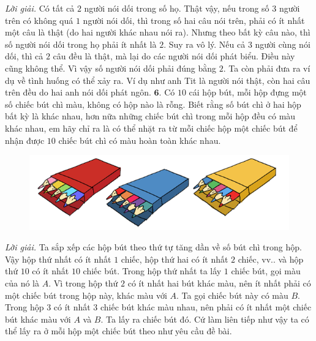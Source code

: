 \begin{multicols}{2}
\begin{figure}[H]
		\vspace*{-15pt}
	\end{figure}
	\textit{Lời giải.} Có tất cả $2$ người nói dối trong số họ. Thật vậy, nếu trong số $3$ người trên có không quá $1$ người nói dối, thì trong số hai câu nói trên, phải có ít nhất một câu là thật (do hai người khác nhau nói ra). Nhưng theo bất kỳ câu nào, thì số người nói dối trong họ phải ít nhất là $2$. Suy ra vô lý.
	\vskip 0.1cm
	Nếu cả $3$ người cùng nói dối, thì cả $2$ câu đều là thật, mà lại do các người nói dối phát biểu. Điều này cũng không thể.
	\vskip 0.1cm
	Vì vậy số người nói dối phải đúng bằng $2$.
	\vskip 0.1cm
	Ta còn phải đưa ra ví dụ về tình huống có thể xảy ra. Ví dụ như anh Tit là người nói thật, còn hai câu trên đều do hai anh nói dối phát ngôn.
	\vskip 0.1cm
	$\pmb{6.}$ Có $10$ cái hộp bút, mỗi hộp đựng một số chiếc bút chì màu, không có hộp nào là rỗng. Biết rằng số bút chì ở hai hộp bất kỳ là khác nhau, hơn nữa những chiếc bút chì trong mỗi hộp đều có màu khác nhau, em hãy chỉ ra là có thể nhặt ra từ mỗi chiếc hộp một chiếc bút để nhận được $10$ chiếc bút chì có màu hoàn toàn khác nhau. 
	\begin{figure}[H]
		\vspace*{-5pt}
		\centering
		\captionsetup{labelformat= empty, justification=centering}
		\includegraphics[width= 1\linewidth]{b6}
		\vspace*{-15pt}
	\end{figure}
	\textit{Lời giải.} Ta sắp xếp các hộp bút theo thứ tự tăng dần về số bút chì trong hộp. Vậy hộp thứ nhất có ít nhất $1$ chiếc, hộp thứ hai có ít nhất $2$ chiếc, vv.. và hộp thứ $10$ có ít  nhất $10$ chiếc bút.
	\vskip 0.1cm
	Trong hộp thứ nhất ta lấy $1$ chiếc bút, gọi màu của nó là $A$. Vì trong hộp thứ $2$ có ít nhất hai bút khác màu, nên ít nhất phải có một chiếc bút trong hộp này, khác màu với $A$. Ta gọi chiếc bút này có màu $B$. Trong hộp $3$ có ít nhất $3$ chiếc bút khác màu nhau, nên phải có ít nhất một chiếc bút khác màu với $A$ và $B$. Ta lấy ra chiếc bút đó. Cứ làm liên tiếp như vậy ta có thể lấy ra ở mỗi hộp một chiếc bút theo như yêu cầu đề bài.
\end{multicols}
